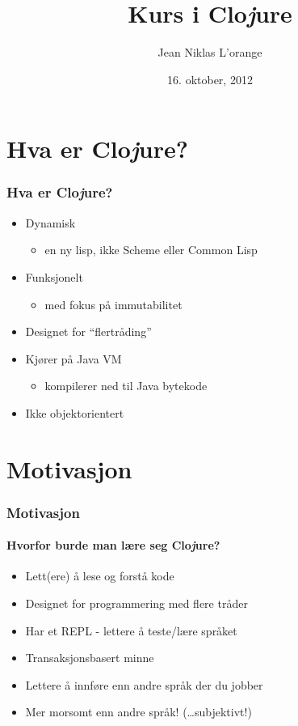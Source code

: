 \documentclass{beamer}
\title[Introduksjonskurs til programmeringsspråket Clo{\em j}ure]{Kurs i Clo{\em j}ure}
\author{Jean Niklas L'orange}
\institute{\texttt{jeannikl@hypirion.com}}
\date{16. oktober, 2012}
\begin{document}
\begin{frame}
  \titlepage
\end{frame}

\section{Hva er Clo{\em j}ure?}

\begin{frame}
  \frametitle{Hva er Clo{\em j}ure?}
  \begin{itemize}
  \item<1-> Dynamisk
    \begin{itemize}
      \item<2-> en ny lisp, ikke Scheme eller Common Lisp
    \end{itemize}
  \item<3-> Funksjonelt
    \begin{itemize}
      \item<4-> med fokus på immutabilitet
    \end{itemize}
  \item<5-> Designet for ``flertråding''
  \item<6-> Kjører på Java VM
    \begin{itemize}
      \item<7-> kompilerer ned til Java bytekode
    \end{itemize}
  \item<8-> Ikke objektorientert 
  \end{itemize}
\end{frame}

\section{Motivasjon}

\begin{frame}
  \frametitle{Motivasjon}
  \framesubtitle{Hvorfor burde man lære seg Clo{\em j}ure?}
  \begin{itemize}
    \item<1-> Lett(ere) å lese og forstå kode
    \item<2-> Designet for programmering med flere tråder
    \item<3-> Har et REPL - lettere å teste/lære språket
    \item<4-> Transaksjonsbasert minne
    \item<5-> Lettere å innføre enn andre språk der du jobber
    \item<6-> Mer morsomt enn andre språk! \pause (\ldots subjektivt!)
  \end{itemize}
\end{frame}
\end{document}
